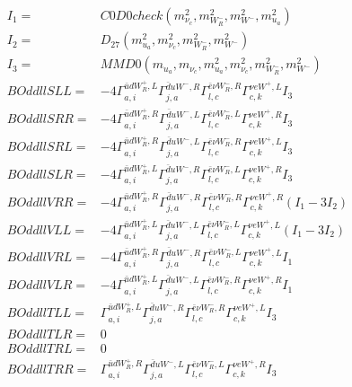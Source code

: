 \documentclass[A4,landscape]{article}
\begin{document}
\begin{align} 
I_1 = & C0D0check(m^2_{\nu_{{c}}}, m^2_{W_R^-}, m^2_{W^-}, m^2_{u_{{a}}}) \\ 
I_2 = & D_{27}(m^2_{u_{{a}}}, m^2_{\nu_{{c}}}, m^2_{W_R^-}, m^2_{W^-}) \\ 
I_3 = & MMD0(m_{u_{{a}}}, m_{\nu_{{c}}}, m^2_{u_{{a}}}, m^2_{\nu_{{c}}}, m^2_{W_R^-}, m^2_{W^-}) \\ 
  BOddllSLL= & -4  \Gamma^{\bar{u}d W_R^+,L}_{a, i} \Gamma^{\bar{d}u W^- ,R}_{j, a} \Gamma^{\bar{e}\nu W_R^- ,R}_{l, c} \Gamma^{\nu e W^+,L}_{c, k} I_3 \\ 
  BOddllSRR= & -4  \Gamma^{\bar{u}d W_R^+,R}_{a, i} \Gamma^{\bar{d}u W^- ,L}_{j, a} \Gamma^{\bar{e}\nu W_R^- ,L}_{l, c} \Gamma^{\nu e W^+,R}_{c, k} I_3 \\ 
  BOddllSRL= & -4  \Gamma^{\bar{u}d W_R^+,R}_{a, i} \Gamma^{\bar{d}u W^- ,L}_{j, a} \Gamma^{\bar{e}\nu W_R^- ,R}_{l, c} \Gamma^{\nu e W^+,L}_{c, k} I_3 \\ 
  BOddllSLR= & -4  \Gamma^{\bar{u}d W_R^+,L}_{a, i} \Gamma^{\bar{d}u W^- ,R}_{j, a} \Gamma^{\bar{e}\nu W_R^- ,L}_{l, c} \Gamma^{\nu e W^+,R}_{c, k} I_3 \\ 
  BOddllVRR= & -4  \Gamma^{\bar{u}d W_R^+,R}_{a, i} \Gamma^{\bar{d}u W^- ,R}_{j, a} \Gamma^{\bar{e}\nu W_R^- ,R}_{l, c} \Gamma^{\nu e W^+,R}_{c, k} (I_1 - 3 I_2) \\ 
  BOddllVLL= & -4  \Gamma^{\bar{u}d W_R^+,L}_{a, i} \Gamma^{\bar{d}u W^- ,L}_{j, a} \Gamma^{\bar{e}\nu W_R^- ,L}_{l, c} \Gamma^{\nu e W^+,L}_{c, k} (I_1 - 3 I_2) \\ 
  BOddllVRL= & -4  \Gamma^{\bar{u}d W_R^+,R}_{a, i} \Gamma^{\bar{d}u W^- ,R}_{j, a} \Gamma^{\bar{e}\nu W_R^- ,L}_{l, c} \Gamma^{\nu e W^+,L}_{c, k} I_1 \\ 
  BOddllVLR= & -4  \Gamma^{\bar{u}d W_R^+,L}_{a, i} \Gamma^{\bar{d}u W^- ,L}_{j, a} \Gamma^{\bar{e}\nu W_R^- ,R}_{l, c} \Gamma^{\nu e W^+,R}_{c, k} I_1 \\ 
  BOddllTLL= &  \Gamma^{\bar{u}d W_R^+,L}_{a, i} \Gamma^{\bar{d}u W^- ,R}_{j, a} \Gamma^{\bar{e}\nu W_R^- ,R}_{l, c} \Gamma^{\nu e W^+,L}_{c, k} I_3 \\ 
  BOddllTLR= & 0 \\ 
  BOddllTRL= & 0 \\ 
  BOddllTRR= &  \Gamma^{\bar{u}d W_R^+,R}_{a, i} \Gamma^{\bar{d}u W^- ,L}_{j, a} \Gamma^{\bar{e}\nu W_R^- ,L}_{l, c} \Gamma^{\nu e W^+,R}_{c, k} I_3 \\ 
\end{align} 
\end{document}
